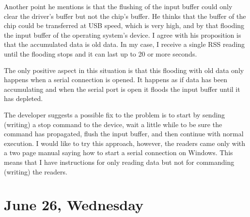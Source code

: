 \documentclass[a4paper,12pt]{article}
\begin{document}
\begin{itemize}
	Another point he mentions is that the flushing of the input buffer could only clear the driver's buffer but not the chip's buffer. He thinks that the buffer of the chip could be transferred at USB speed, which is very high, and by that flooding the input buffer of the operating system's device. I agree with his proposition is that the accumulated data is old data. In my case, I receive a single RSS reading until the flooding stops and it can last up to 20 or more seconds.
	
	The only positive aspect in this situation is that this flooding with old data only happens when a serial connection is opened. It happens as if data has been accumulating and when the serial port is open it floods the input buffer until it has depleted.
	
	The developer suggests a possible fix to the problem is to start by sending (writing) a stop command to the device, wait a little while to be sure the command has propagated, flush the input buffer, and then continue with normal execution. I would like to try this approach, however, the readers came only with a two page manual saying how to start a serial connection on Windows. This means that I have instructions for only reading data but not for commanding (writing) the readers.
\end{itemize}

\section{June 26, Wednesday}
\end{document}
